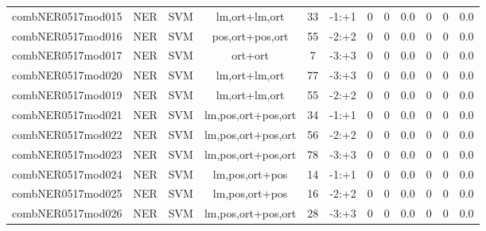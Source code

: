 \documentclass[a4paper]{article}
\begin{document}
\begin{landscape}
\begin{center}
\begin{tabular}{ |c|c|c|c|c|c|c|c|c|c|c|c|}
 
 	
 	\small{ combNER0517mod015 } & NER & SVM & lm,ort+lm,ort  &  33 &  -1:+1  &  0 & 0 & 0.0  &  0 & 0 & 0.0 \\
 	

 
 	
 	\small{ combNER0517mod016 } & NER & SVM & pos,ort+pos,ort  &  55 &  -2:+2  &  0 & 0 & 0.0  &  0 & 0 & 0.0 \\
 	

 
 	
 	\small{ combNER0517mod017 } & NER & SVM & ort+ort  &  7 &  -3:+3  &  0 & 0 & 0.0  &  0 & 0 & 0.0 \\
 	

 
 	
 	\small{ combNER0517mod020 } & NER & SVM & lm,ort+lm,ort  &  77 &  -3:+3  &  0 & 0 & 0.0  &  0 & 0 & 0.0 \\
 	

 
 	
 	\small{ combNER0517mod019 } & NER & SVM & lm,ort+lm,ort  &  55 &  -2:+2  &  0 & 0 & 0.0  &  0 & 0 & 0.0 \\
 	

 
 	
 	\small{ combNER0517mod021 } & NER & SVM & lm,pos,ort+pos,ort  &  34 &  -1:+1  &  0 & 0 & 0.0  &  0 & 0 & 0.0 \\
 	

 
 	
 	\small{ combNER0517mod022 } & NER & SVM & lm,pos,ort+pos,ort  &  56 &  -2:+2  &  0 & 0 & 0.0  &  0 & 0 & 0.0 \\
 	

 
 	
 	\small{ combNER0517mod023 } & NER & SVM & lm,pos,ort+pos,ort  &  78 &  -3:+3  &  0 & 0 & 0.0  &  0 & 0 & 0.0 \\
 	

 
 	
 	\small{ combNER0517mod024 } & NER & SVM & lm,pos,ort+pos  &  14 &  -1:+1  &  0 & 0 & 0.0  &  0 & 0 & 0.0 \\
 	

 
 	
 	\small{ combNER0517mod025 } & NER & SVM & lm,pos,ort+pos  &  16 &  -2:+2  &  0 & 0 & 0.0  &  0 & 0 & 0.0 \\
 	

 
 	
 	\small{ combNER0517mod026 } & NER & SVM & lm,pos,ort+pos,ort  &  28 &  -3:+3  &  0 & 0 & 0.0  &  0 & 0 & 0.0 \\
 	


\end{tabular}
\end{center}
\end{landscape}
\end{document}
